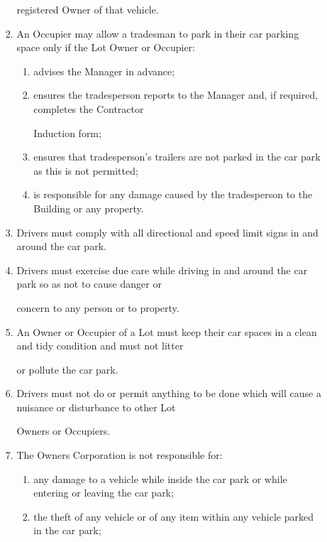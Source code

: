 \documentclass{article}
\begin{document}
\begin{enumerate}[label=\arabic*.]
\begin{enumerate}[label=\arabic{enumi}.\arabic*.]
\begin{enumerate}[label=(\arabic*)]
registered Owner of that vehicle. 

\item  An Occupier may allow a tradesman to park in their car parking space only if the Lot Owner or Occupier: 

\begin{enumerate}[label=(\alph*)]
\item  advises the Manager in advance; 

\item  ensures the tradesperson reports to the Manager and, if required, completes the Contractor 

Induction form; 

\item  ensures that tradesperson’s trailers are not parked in the car park as this is not permitted; 

\item  is responsible for any damage caused by the tradesperson to the Building or any property. 

\end{enumerate}
\item  Drivers must comply with all directional and speed limit signs in and around the car park. 

\item  Drivers must exercise due care while driving in and around the car park so as not to cause danger or 

concern to any person or to property. 

\item  An Owner or Occupier of a Lot must keep their car spaces in a clean and tidy condition and must not litter 

or pollute the car park. 

\item  Drivers must not do or permit anything to be done which will cause a nuisance or disturbance to other Lot 

Owners or Occupiers. 

\item  The Owners Corporation is not responsible for: 

\begin{enumerate}[label=(\alph*)]
\item  any damage to a vehicle while inside the car park or while entering or leaving the car park; 

\item  the theft of any vehicle or of any item within any vehicle parked in the car park; 


\end{enumerate}
\end{enumerate}
\end{enumerate}
\end{enumerate}
\end{document}

